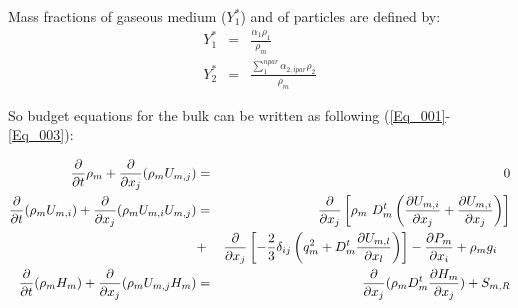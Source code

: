 Mass fractions of gaseous medium ($Y_{1}^{*}$) and of particles are defined by:
\begin{eqnarray}
  Y_{1}^{*} &=& \frac{\alpha_{1}\rho_{1}}{\rho_{m}} \nonumber\\
  Y_{2}^{*} &=& \frac{\sum_{1}^{npar}\alpha_{2,ipar} \rho_{2}}{\rho_{m}} 
\end{eqnarray}

So budget equations for the bulk can be written as following
(\ref{Eq_001}-\ref{Eq_003}):

\begin{eqnarray}
\displaystyle  \frac{\partial}{\partial t    } \rho_{m}
\displaystyle +\frac{\partial}{\partial x_{j}} (\rho_{m}U_{m,j}) & = & 0                                                                                                 \label{Eq_001} \\ 
\displaystyle  \frac{\partial}{\partial t    } (\rho_{m}U_{m,i})
\displaystyle +\frac{\partial}{\partial x_{j}} (\rho_{m}U_{m,i}U_{m,j})
\displaystyle                                                    & = &  \frac{\partial}{\partial x_{j}} \left[ 
\displaystyle                                                                       \rho_{m}~D_{m}^{t}\left( \frac{\partial U_{m,i}}{\partial x_{j}}
\displaystyle                                                                                          +\frac{\partial U_{m,i}}{\partial x_{j}} \right) \right]          \nonumber \\
\displaystyle                                                    & + &  \frac{\partial}{\partial x_{j}} \left[        
\displaystyle                                                                                          -\frac{2}{3}\delta_{ij}\left(  q_{m}^{2}
\displaystyle                                                                                          +D_{m}^{t}\frac{\partial U_{m,l}}{\partial x_{l}}\right) \right]
\displaystyle                                                                                          -\frac{\partial P_{m}}{\partial x_{i}}+\rho_{m}g_{i}    \quad           \label{Eq_002} \\
\displaystyle  \frac{\partial}{\partial t    } (\rho_{m} H_{m})
\displaystyle +\frac{\partial}{\partial x_{j}} (\rho_{m}U_{m,j}H_{m})
\displaystyle                                                    & = & \frac{\partial}{\partial x_{j}} (\rho_{m}D_{m}^{t} \frac{\partial H_{m}}{\partial x_{j}}) + S_{m,R}\label{Eq_003}
\end{eqnarray}

